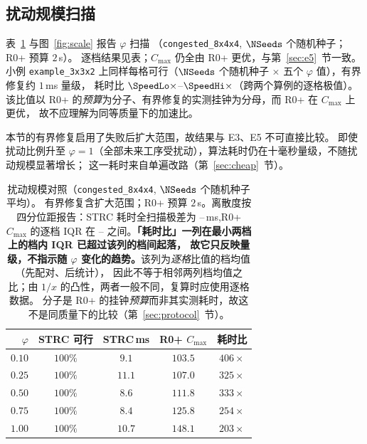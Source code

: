 \subsection{扰动规模扫描}
\label{sec:scale}

表~\ref{tab:scale} 与图~\ref{fig:scale} 报告 \(\varphi\) 扫描
（\texttt{congested\_8x4x4}, \(\NSeeds\) 个随机种子；R0+ 预算 \(2\)\,s）。
逐档结果见表；\(C_{\max}\) 仍全由 R0+ 更优，与第~\ref{sec:e5}~节一致。
小例 \texttt{example\_3x3x2} 上同样每格可行（\(\NSeeds\) 个随机种子 \(\times\) 五个
\(\varphi\) 值），有界修复约 \(1\)\,ms 量级，
耗时比 \(\SpeedLo\times\)--\(\SpeedHi\times\)（跨两个算例的逐格极值）。该比值以 R0+ 的\emph{预算}为分子、有界修复的实测挂钟为分母，而 R0+ 在 \(C_{\max}\) 上更优，
故不应理解为同等质量下的加速比。

本节的有界修复启用了失败后扩大范围，故结果与 E3、E5 不可直接比较。
即使扰动比例升至 \(\varphi=1\)（全部未来工序受扰动），算法耗时仍在十毫秒量级，不随扰动规模显著增长；
这一耗时来自单遍改路（第~\ref{sec:cheap}~节）。

\begin{table}[t]
\centering
\caption{扰动规模对照（\texttt{congested\_8x4x4}, \(\NSeeds\) 个随机种子平均）。
有界修复含扩大范围；R0+ 预算 \(2\)\,s。离散度按四分位距报告：STRC 耗时全扫描极差为
\ScaleMsMin--\ScaleMsMax\,ms,R0+ \(C_{\max}\) 的逐档 IQR 在 \ScaleCmaxIqrLo--\ScaleCmaxIqrHi
之间。\textbf{「耗时比」一列在最小两档上的档内 IQR 已超过该列的档间起落，
故它只反映量级，不指示随 \(\varphi\) 变化的趋势。}该列为\emph{逐格}比值的档均值（先配对、后统计），
因此不等于相邻两列档均值之比；由 \(1/x\) 的凸性，两者一般不同，复算时应使用逐格数据。
分子是 R0+ 的挂钟\emph{预算}而非其实测耗时，故这不是同质量下的比较（第~\ref{sec:protocol}~节）。}
\label{tab:scale}
\small
\begin{tabular}{@{}rcccc@{}}
\toprule
\(\varphi\) & STRC 可行 & STRC\,ms & R0+ \(C_{\max}\) & 耗时比 \\
\midrule
\(0.10\) & \(100\%\) & \(9.1\)  & \(103.5\) & \(406\times\) \\
\(0.25\) & \(100\%\) & \(11.1\) & \(107.0\) & \(325\times\) \\
\(0.50\) & \(100\%\) & \(8.6\)  & \(111.8\) & \(333\times\) \\
\(0.75\) & \(100\%\) & \(8.4\)  & \(125.8\) & \(254\times\) \\
\(1.00\) & \(100\%\) & \(10.7\) & \(148.1\) & \(203\times\) \\
\bottomrule
\end{tabular}
\end{table}

